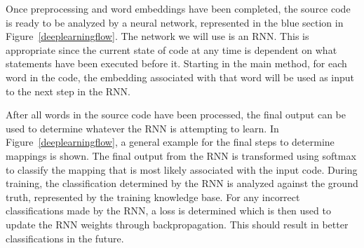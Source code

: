 Once preprocessing and word embeddings have been completed, the source code is ready to be analyzed by a neural network, represented in the blue section in Figure~\ref{deeplearningflow}. The network we will use is an RNN. This is appropriate since the current state of code at any time is dependent on what statements have been executed before it. Starting in the main method, for each word in the code, the embedding associated with that word will be used as input to the next step in the RNN.

After all words in the source code have been processed, the final output can be used to determine whatever the RNN is attempting to learn. In Figure~\ref{deeplearningflow}, a general example for the final steps to determine mappings is shown. The final output from the RNN is transformed using softmax to classify the mapping that is most likely associated with the input code. During training, the classification determined by the RNN is analyzed against the ground truth, represented by the training knowledge base. For any incorrect classifications made by the RNN, a loss is determined which is then used to update the RNN weights through backpropagation. This should result in better classifications in the future.


